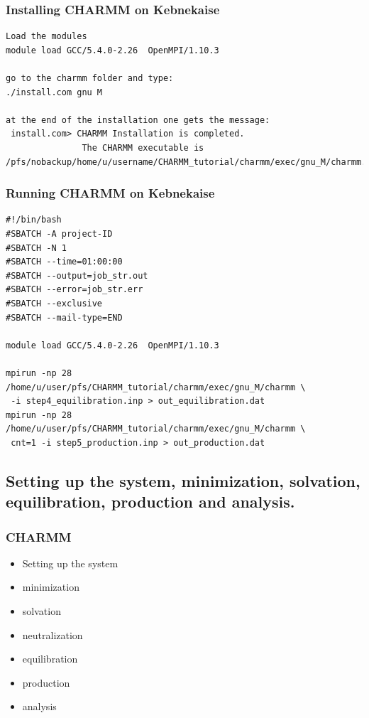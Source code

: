 \documentclass{beamer}
\begin{document}
\begin{frame}[fragile]
\frametitle{Installing CHARMM on Kebnekaise}


\begin{verbatim} 
Load the modules 
module load GCC/5.4.0-2.26  OpenMPI/1.10.3

go to the charmm folder and type:
./install.com gnu M

at the end of the installation one gets the message:
 install.com> CHARMM Installation is completed.
               The CHARMM executable is /pfs/nobackup/home/u/username/CHARMM_tutorial/charmm/exec/gnu_M/charmm.
\end{verbatim} 

\end{frame}

\begin{frame}[fragile]
\frametitle{Running CHARMM on Kebnekaise}

\begin{verbatim} 
#!/bin/bash
#SBATCH -A project-ID
#SBATCH -N 1
#SBATCH --time=01:00:00
#SBATCH --output=job_str.out
#SBATCH --error=job_str.err
#SBATCH --exclusive
#SBATCH --mail-type=END

module load GCC/5.4.0-2.26  OpenMPI/1.10.3

mpirun -np 28 /home/u/user/pfs/CHARMM_tutorial/charmm/exec/gnu_M/charmm \
 -i step4_equilibration.inp > out_equilibration.dat
mpirun -np 28 /home/u/user/pfs/CHARMM_tutorial/charmm/exec/gnu_M/charmm \
 cnt=1 -i step5_production.inp > out_production.dat
\end{verbatim} 

\end{frame}
\subsection{Setting up the system, minimization, solvation, equilibration, production and analysis.}


\begin{frame}
\frametitle{CHARMM}

\begin{itemize}
\item Setting up the system
\item minimization
\item solvation
\item neutralization
\item equilibration
\item production 
\item analysis
\end{itemize}

\end{frame}
\end{document}
